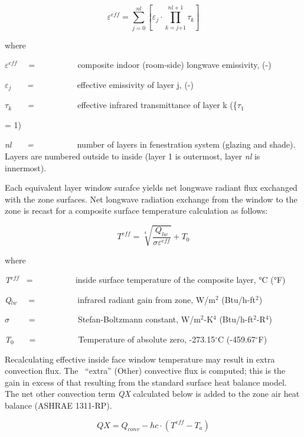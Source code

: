 {\begin{equation}
{\varepsilon ^{eff}} = \sum\limits_{j = 0}^{nl} {\left[ {{\varepsilon_j} \cdot \prod\limits_{k = j{ + 1}}^{nl + {1}} {{\tau_k}} } \right]}
\end{equation}

where

\emph{$\varepsilon$\(^{eff}\)}~~ = ~~~~~~~~~ composite indoor (room-side) longwave emissivity, (-)

\emph{$\varepsilon$\(_{j}\)~~~ = ~~~~~~~~~} effective emissivity of layer j, (-)

\emph{$\tau$\(_{k}\)~~~ = ~~~~~~~~~} effective infrared transmittance of layer k (\{$\tau$\(_{1}\)} = 1)

\emph{nl~~~ = ~~~~~~~~~} number of layers in fenestration system (glazing and shade). Layers are numbered outside to inside (layer 1 is outermost, layer \emph{nl} is innermost).

Each equivalent layer window surafce yields net longwave radiant flux exchanged with the zone surfaces. Net longwave radiation exchange from the window to the zone is recast for a composite surface temperature calculation as follows:

\begin{equation}
{T^{eff}} = \sqrt[4]{{\frac{{{Q_{lw}}}}{{\sigma {\varepsilon ^{eff}}}}}} + {T_0}
\end{equation}

where

\emph{T\(^{eff}\)}~ = ~~~~~~~~~ inside surface temperature of the composite layer, °C (°F)

\emph{Q\(_{lw}\)}~~ = ~~~~~~~~~ infrared radiant gain from zone, W/m\(^{2}\) (Btu/h-ft\(^{2}\))

\emph{$\sigma$}~~~~ = ~~~~~~~~~ Stefan-Boltzmann constant, W/m\(^{2}\)-K\(^{4}\) (Btu/h-ft\(^{2}\)-R\(^{4}\))

\emph{T\(_{0}\)}~~~ = ~~~~~~~~~ Temperature of absolute zero, -273.15$^{\circ}$C (-459.67$^{\circ}$F)

Recalculating effective inside face window temperature may result in extra convection flux. The~ ``extra'' (Other) convective flux is computed; this is the gain in excess of that resulting from the standard surface heat balance model. The net other convection term \emph{QX} calculated below is added to the zone air heat balance (ASHRAE 1311-RP).

\begin{equation}
QX = {Q_{conv}} - hc \cdot ({T^{eff}} - {T_a})
\end{equation}


